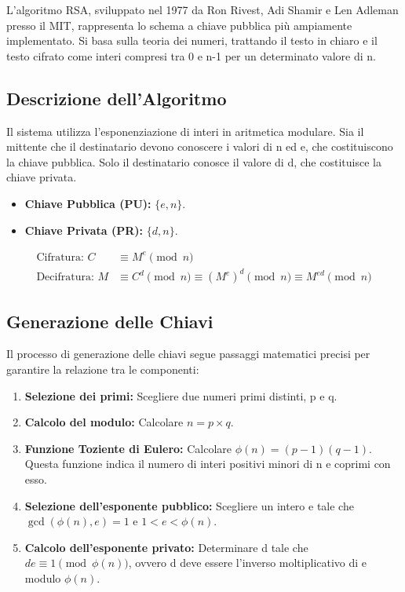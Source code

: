 \documentclass{article}
\begin{document}
L'algoritmo RSA, sviluppato nel 1977 da Ron Rivest, Adi Shamir e Len Adleman presso il MIT, rappresenta lo schema a chiave pubblica più ampiamente implementato. Si basa sulla teoria dei numeri, trattando il testo in chiaro e il testo cifrato come interi compresi tra 0 e n-1 per un determinato valore di n.

\subsection*{Descrizione dell'Algoritmo}
Il sistema utilizza l'esponenziazione di interi in aritmetica modulare. Sia il mittente che il destinatario devono conoscere i valori di n ed e, che costituiscono la chiave pubblica. Solo il destinatario conosce il valore di d, che costituisce la chiave privata.

\begin{itemize}
    \item \textbf{Chiave Pubblica (PU):} $\{e, n\}$.
    \item \textbf{Chiave Privata (PR):} $\{d, n\}$.
\end{itemize}

\begin{align*}
    \text{Cifratura: } C &\equiv M^e \pmod n \\
    \text{Decifratura: } M &\equiv C^d \pmod n \equiv (M^e)^d \pmod n \equiv M^{ed} \pmod n
\end{align*}

\subsection*{Generazione delle Chiavi}
Il processo di generazione delle chiavi segue passaggi matematici precisi per garantire la relazione tra le componenti:

\begin{enumerate}
    \item \textbf{Selezione dei primi:} Scegliere due numeri primi distinti, p e q.
    \item \textbf{Calcolo del modulo:} Calcolare $n = p \times q$.
    \item \textbf{Funzione Toziente di Eulero:} Calcolare $\phi(n) = (p-1)(q-1)$. Questa funzione indica il numero di interi positivi minori di n e coprimi con esso.
    \item \textbf{Selezione dell'esponente pubblico:} Scegliere un intero e tale che $\gcd(\phi(n), e) = 1$ e $1 < e < \phi(n)$.
    \item \textbf{Calcolo dell'esponente privato:} Determinare d tale che $de \equiv 1 \pmod{\phi(n)}$, ovvero d deve essere l'inverso moltiplicativo di e modulo $\phi(n)$.
\end{enumerate}
\end{document}
